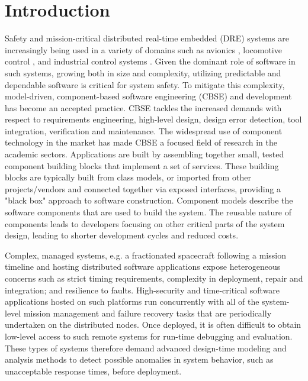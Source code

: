 \chapter{Introduction}
\label{chapter:introduction}

Safety and mission-critical distributed real-time embedded (DRE) systems are increasingly being used in a variety of domains such as avionics \cite{burke2010distributed}, locomotive control \cite{zimmermann2003train}, and industrial control systems \cite{zoitl2008real}.  
Given the dominant role of software in such systems, growing both in size and complexity, utilizing predictable and dependable software is critical for system safety. To mitigate this complexity, model-driven, component-based software engineering (CBSE) and development \cite{beydeda2005model, heineman2001component, clemens1998component} has become an accepted practice. CBSE tackles the increased demands with respect to requirements engineering, high-level design, design error detection, tool integration, verification and maintenance. The widespread use of component technology in the market has made CBSE a focused field of research in the academic sectors. Applications are built by assembling together small, tested component building blocks that implement a set of services. These building blocks are typically built from class models, or imported from other projects/vendors and connected together via exposed interfaces, providing a "black box" approach to software construction. Component models describe the software components that are used to build the system. The reusable nature of components leads to developers focusing on other critical parts of the system design, leading to shorter development cycles and reduced costs. 

Complex, managed systems, e.g. a fractionated spacecraft following a mission
timeline and hosting distributed software applications expose heterogeneous concerns such as strict timing requirements, complexity in deployment, repair and integration; and resilience to faults. High-security and time-critical software applications hosted on such platforms run concurrently with all of the system-level mission management and failure recovery tasks that are periodically undertaken on the distributed nodes. Once deployed, it is often difficult to obtain low-level access to such remote systems for run-time debugging and evaluation. These types of systems therefore demand advanced design-time modeling and analysis methods to detect possible anomalies in system behavior, such as unacceptable response times, before deployment.


